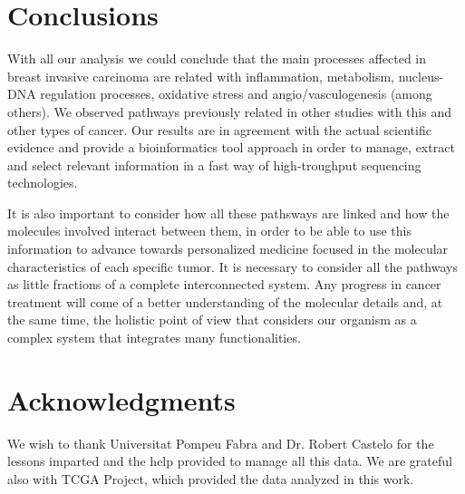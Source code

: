 \documentclass[9pt,twocolumn,twoside]{gsajnl}
\begin{document}
\section*{Conclusions}
With all our analysis we could conclude that the main processes affected in breast invasive carcinoma are related with inflammation, metabolism, nucleus-DNA regulation processes, oxidative stress and angio/vasculogenesis (among others). We observed pathways previously related in other studies with this and other types of cancer. Our results are in agreement with the actual scientific evidence and provide a bioinformatics tool approach in order to manage, extract and select relevant information in a fast way of high-troughput sequencing technologies.
\vspace{2mm}

It is also important to consider how all these pathsways are linked and how the molecules involved interact between them, in order to be able to use this information to advance towards personalized medicine focused in the molecular characteristics of each specific tumor. It is necessary to consider all the pathways as little fractions of a complete interconnected system. Any progress in cancer treatment will come of a better understanding of the molecular details and, at the same time, the holistic point of view that considers our organism as a complex system that integrates many functionalities.

\section*{Acknowledgments}
We wish to thank Universitat Pompeu Fabra and Dr. Robert Castelo for the lessons imparted and the help provided to manage all this data. We are grateful also with TCGA Project, which provided the data analyzed in this work.


\end{document}
